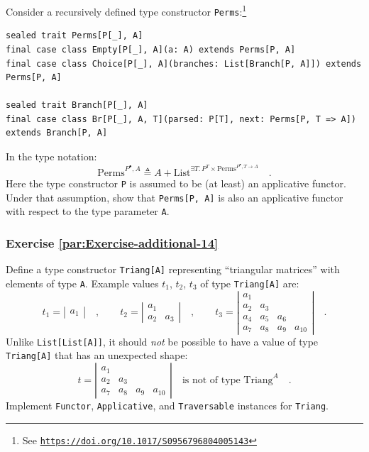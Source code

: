 Consider a recursively defined type constructor \lstinline!Perms!:\footnote{See \texttt{\href{https://doi.org/10.1017/S0956796804005143}{https://doi.org/10.1017/S0956796804005143}}}
\begin{lstlisting}
sealed trait Perms[P[_], A]
final case class Empty[P[_], A](a: A) extends Perms[P, A]
final case class Choice[P[_], A](branches: List[Branch[P, A]]) extends Perms[P, A]

sealed trait Branch[P[_], A]
final case class Br[P[_], A, T](parsed: P[T], next: Perms[P, T => A]) extends Branch[P, A]
\end{lstlisting}
In the type notation:
\[
\text{Perms}^{P^{\bullet},A}\triangleq A+\text{List}^{\exists T.\,P^{T}\times\text{Perms}^{P^{\bullet},T\rightarrow A}}\quad.
\]
Here the type constructor \lstinline!P! is assumed to be (at least)
an applicative functor. Under that assumption, show that \lstinline!Perms[P, A]!
is also an applicative functor with respect to the type parameter
\lstinline!A!. 

\subsubsection{Exercise \label{par:Exercise-additional-14}\ref{par:Exercise-additional-14}}

Define a type constructor \lstinline!Triang[A]! representing \textsf{``}triangular
matrices\textsf{''} with elements of type \lstinline!A!. Example values $t_{1}$,
$t_{2}$, $t_{3}$ of type \lstinline!Triang[A]! are:
\[
t_{1}=\left|\begin{array}{c}
a_{1}\end{array}\right|\quad,\quad\quad t_{2}=\left|\begin{array}{cc}
a_{1}\\
a_{2} & a_{3}
\end{array}\right|\quad,\quad\quad t_{3}=\left|\begin{array}{cccc}
a_{1}\\
a_{2} & a_{3}\\
a_{4} & a_{5} & a_{6}\\
a_{7} & a_{8} & a_{9} & a_{10}
\end{array}\right|\quad.
\]
Unlike \lstinline!List[List[A]]!, it should \emph{not} be possible
to have a value of type \lstinline!Triang[A]! that has an unexpected
shape:
\[
t=\left|\begin{array}{cccc}
a_{1}\\
a_{2} & a_{3}\\
a_{7} & a_{8} & a_{9} & a_{10}
\end{array}\right|\quad\text{is not of type }\text{Triang}^{A}\quad.
\]
 Implement \lstinline!Functor!, \lstinline!Applicative!, and \lstinline!Traversable!
instances for \lstinline!Triang!.

